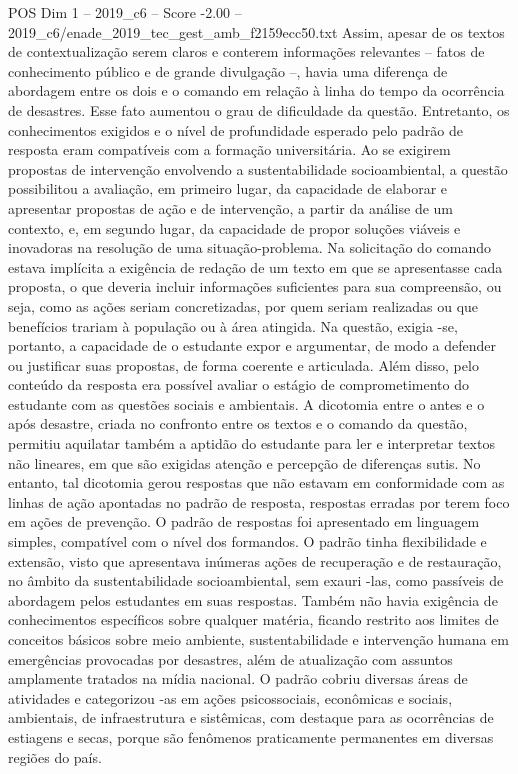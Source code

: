 \begin{textsample}{POS Dim 1 – 2019\_c6 – Score -2.00 – 2019\_c6/enade\_2019\_tec\_gest\_amb\_f2159ecc50.txt}
Assim, apesar de os textos de contextualização serem claros e conterem informações relevantes – fatos de conhecimento público e de grande divulgação –, havia uma diferença de abordagem entre os dois e o comando em relação à linha do tempo da ocorrência de desastres.
Esse fato aumentou o grau de dificuldade da questão.
Entretanto, os conhecimentos exigidos e o nível de profundidade esperado pelo padrão de resposta eram compatíveis com a formação universitária.
Ao se exigirem propostas de intervenção envolvendo a sustentabilidade socioambiental, a questão possibilitou a avaliação, em primeiro lugar, da capacidade de elaborar e apresentar propostas de ação e de intervenção, a partir da análise de um contexto, e, em segundo lugar, da capacidade de propor soluções viáveis e inovadoras na resolução de uma situação-problema.
Na solicitação do comando estava implícita a exigência de redação de um texto em que se apresentasse cada proposta, o que deveria incluir informações suficientes para sua compreensão, ou seja, como as ações seriam concretizadas, por quem seriam realizadas ou que benefícios trariam à população ou à área atingida.
Na questão, exigia -se, portanto, a capacidade de o estudante expor e argumentar, de modo a defender ou justificar suas propostas, de forma coerente e articulada.
Além disso, pelo conteúdo da resposta era possível avaliar o estágio de comprometimento do estudante com as questões sociais e ambientais.
A dicotomia entre o antes e o após desastre, criada no confronto entre os textos e o comando da questão, permitiu aquilatar também a aptidão do estudante para ler e interpretar textos não lineares, em que são exigidas atenção e percepção de diferenças sutis.
No entanto, tal dicotomia gerou respostas que não estavam em conformidade com as linhas de ação apontadas no padrão de resposta, respostas erradas por terem foco em ações de prevenção.
O padrão de respostas foi apresentado em linguagem simples, compatível com o nível dos formandos.
O padrão tinha flexibilidade e extensão, visto que apresentava inúmeras ações de recuperação e de restauração, no âmbito da sustentabilidade socioambiental, sem exauri -las, como passíveis de abordagem pelos estudantes em suas respostas.
Também não havia exigência de conhecimentos específicos sobre qualquer matéria, ficando restrito aos limites de conceitos básicos sobre meio ambiente, sustentabilidade e intervenção humana em emergências provocadas por desastres, além de atualização com assuntos amplamente tratados na mídia nacional.
O padrão cobriu diversas áreas de atividades e categorizou -as em ações psicossociais, econômicas e sociais, ambientais, de infraestrutura e sistêmicas, com destaque para as ocorrências de estiagens e secas, porque são fenômenos praticamente permanentes em diversas regiões do país.

\end{textsample}
